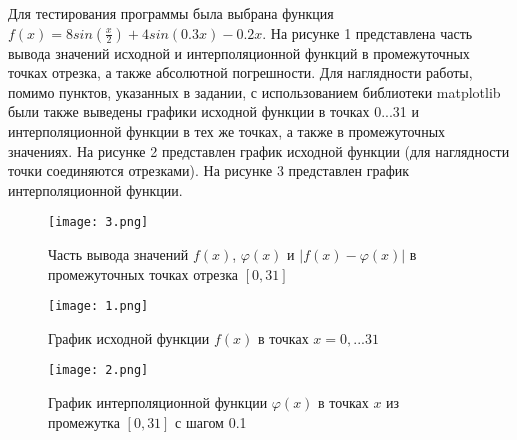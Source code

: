\documentclass[a4paper, 14pt]{extarticle}
\begin{document}
Для тестирования программы была выбрана функция $f(x) = 8sin(\frac{x}{2}) + 4sin(0.3x) - 0.2x$. На рисунке 1 
представлена часть вывода значений исходной и интерполяционной функций в промежуточных точках отрезка, 
а также абсолютной погрешности. Для наглядности работы, помимо пунктов, указанных в задании, с использованием библиотеки matplotlib были также выведены графики исходной функции в точках 0...31 и интерполяционной функции в тех же точках, а также 
в промежуточных значениях. На рисунке 2 представлен график исходной функции (для наглядности точки соединяются отрезками). 
На рисунке 3 представлен график интерполяционной функции.

\begin{figure}[H]
	
	\centering
	
	\texttt{[image: 3.png]}
	\captionsetup{justification=centering}
	\caption{Часть вывода значений $f(x)$, $\varphi(x)$ и $|f(x) - \varphi(x)|$ в промежуточных точках 
		отрезка $[0, 31]$}
	
	\label{fig:mpr}
	
\end{figure}

\begin{figure}[H]

\centering

\texttt{[image: 1.png]}
\captionsetup{justification=centering}
\caption{График исходной функции $f(x)$ в точках $x = 0, ... 31$}

\label{fig:mpr}

\end{figure}

\begin{figure}[H]

\centering

\texttt{[image: 2.png]}
\captionsetup{justification=centering}
\caption{График интерполяционной функции $\varphi(x)$ в точках $x$ из промежутка $[0, 31]$ с шагом 0.1}

\label{fig:mpr}

\end{figure}

\pagebreak
\end{document}
